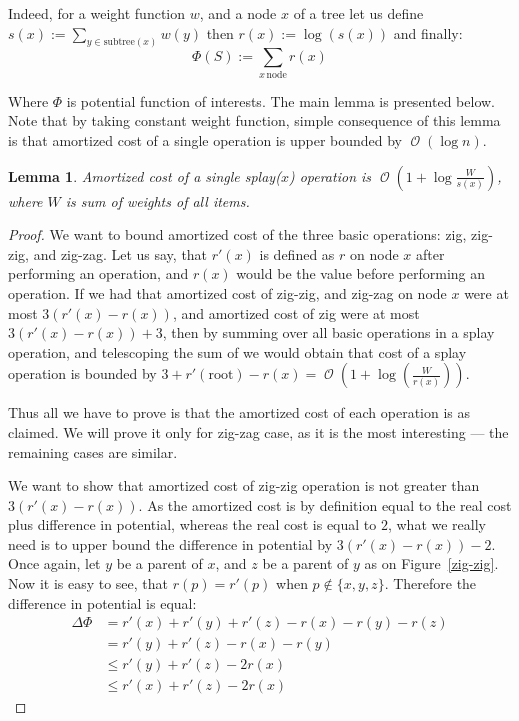 \documentclass[11pt]{article}
\DeclareMathOperator*{\Oh}{\mathcal{O}}
\newtheorem{lemma}[theorem]{Lemma}
\begin{document}
Indeed, for a weight function $w$, and a node $x$ of a tree let us define $s(x) := \sum_{y \in \mathrm{subtree}(x)} w(y)$ then $r(x) := \log(s(x))$ and finally:
\begin{equation*}
\Phi(S) := \sum_{x \, \mathrm{node}} r(x)
\end{equation*}

Where $\Phi$ is potential function of interests. The main lemma is presented below. Note that by taking constant weight function, simple consequence of this lemma is that amortized cost of a single operation is upper bounded by $\Oh(\log n)$.
\begin{lemma}
Amortized cost of a  single splay($x$) operation is $\Oh(1 + \log\frac{W}{s(x)})$, where $W$ is sum of weights of all items.
\end{lemma}
\begin{proof}
We want to bound amortized cost of the three basic operations: zig, zig-zig, and zig-zag. Let us say, that $r'(x)$ is defined as $r$ on node $x$ after performing an operation, and $r(x)$ would be the value before performing an operation. If we had that amortized cost of zig-zig, and zig-zag on node $x$ were at most $3(r'(x) - r(x))$, and amortized cost of zig were at most $3 (r'(x) - r(x)) + 3$, then by summing over all basic operations in a splay operation, and telescoping the sum of we would obtain that cost of a splay operation is bounded by $3 + r'(\mathrm{root}) - r(x) = \Oh(1 + \log(\frac{W}{r(x)}))$.

Thus all we have to prove is that the amortized cost of each operation is as claimed. We will prove it only for zig-zag case, as it is the most interesting --- the remaining cases are similar.

We want to show that amortized cost of zig-zig operation is not greater than $3(r'(x) - r(x))$. As the amortized cost is by definition equal to the real cost plus difference in potential, whereas the real cost is equal to $2$, what we really need is to upper bound the difference in potential by $3(r'(x) - r(x)) - 2$. Once again, let $y$ be a parent of $x$, and $z$ be a parent of $y$ as on Figure~\ref{zig-zig}. Now it is easy to see, that $r(p) = r'(p)$ when $p \not\in \{x,y,z\}$. Therefore the difference in potential is equal:
\begin{align*}
\Delta\Phi & = r'(x) + r'(y) + r'(z) - r(x) - r(y) - r(z) \\
	& = r'(y) + r'(z) - r(x) - r(y) \\
	& \leq r'(y) + r'(z) - 2r(x) \\
	& \leq r'(x) + r'(z) - 2r(x)
\end{align*}


\end{proof}
\end{document}
